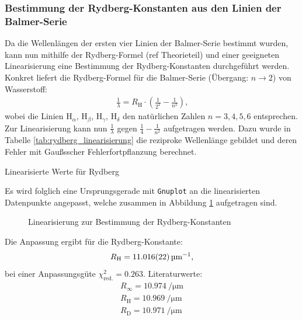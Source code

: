\documentclass[11pt, a4paper]{article}
\numberwithin{equation}{section}
\begin{document}
\subsubsection{Bestimmung der Rydberg-Konstanten aus den Linien der Balmer-Serie}
Da die Wellenlängen der ersten vier Linien der Balmer-Serie bestimmt wurden, kann nun mithilfe der Rydberg-Formel (ref Theorieteil) und einer geeigneten Linearisierung eine Bestimmung der Rydberg-Konstanten durchgeführt werden.
Konkret liefert die Rydberg-Formel für die Balmer-Serie (Übergang: $n \rightarrow 2$) von Wasserstoff:
\begin{align*}
	\frac{1}{\lambda} = R_\mathrm{H} \cdot \left(\frac{1}{2^2} - \frac{1}{n^2} \right) \text{,}
\end{align*}
wobei die Linien H$_\alpha$, H$_\beta$, H$_\gamma$, H$_\delta$ den natürlichen Zahlen $n = 3, 4, 5, 6$ entsprechen.
Zur Linearisierung kann nun $\frac{1}{\lambda}$ gegen $\frac{1}{4} - \frac{1}{n^2}$ aufgetragen werden.
Dazu wurde in Tabelle \ref{tab:rydberg_linearisierung} die reziproke Wellenlänge gebildet und deren Fehler mit Gaußsscher Fehlerfortpflanzung berechnet.
\begin{table}[h]
	\centering
	
	\caption{Linearisierte Werte für Rydberg}
	\label{tab:rydberg_linearisierung}
\end{table}
Es wird folglich eine Ursprungsgerade mit \texttt{Gnuplot} an die linearisierten Datenpunkte angepasst, welche zusammen in Abbildung \ref{fig:rydberg_balmer} aufgetragen sind.
\begin{figure}[h]
	\centering
	
	\caption{Linearisierung zur Bestimmung der Rydberg-Konstanten}
	\label{fig:rydberg_balmer}
\end{figure}
Die Anpassung ergibt für die Rydberg-Konstante:
\begin{align*}
	R_\mathrm{H} = \SI{11.016 +- 0.022}{\per\micro\metre} \text{,}
\end{align*}
bei einer Anpassungsgüte $\chi_\mathrm{red.}^2 = \num{0.263}$.
Literaturwerte:
\begin{align*}
	R_\infty = \SI{10.974}{\per\micro\metre}\\
	R_\mathrm{H} = \SI{10.969}{\per\micro\metre}\\
	R_\mathrm{D} = \SI{10.971}{\per\micro\metre}\\
\end{align*}
\end{document}
